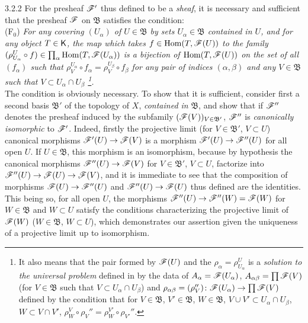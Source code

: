 \documentclass{book}
\begin{document}
\begin{env}{3.2.2}
\label{env-0.3.2.2}
For the presheaf $\mathscr{F}'$ thus defined to be a \emph{sheaf}, it is necessary and sufficient
that the presheaf $\mathscr{F}$ on $\mathfrak{B}$ satisfies the condition:\\

  (F$_0$) \emph{For any covering $(U_\alpha)$ of $U\in\mathfrak{B}$ by sets $U_\alpha\in\mathfrak{B}$
  contained in $U$, and for any object $T\in\mathsf{K}$, the map which takes $f\in{\mathop{\mathrm{Hom}}\nolimits}(T,\mathscr{F}(U))$
  to the family $(\rho_{U_\alpha}^U\circ f)\in\prod_\alpha{\mathop{\mathrm{Hom}}\nolimits}(T,\mathscr{F}(U_\alpha))$ is a bijection of
  ${\mathop{\mathrm{Hom}}\nolimits}(T,\mathscr{F}(U))$ on the set of all $(f_\alpha)$ such that $\rho_V^{U_\alpha}\circ f_\alpha=\rho_V^{U_\beta}\circ f_\beta$
  for any pair of indices $(\alpha,\beta)$ and any $V\in\mathfrak{B}$ such that $V\subset U_\alpha\cap U_\beta$
  \footnote{It also means that the pair formed by $\mathscr{F}(U)$ and the $\rho_\alpha=\rho_{U_\alpha}^U$
  is a \emph{solution to the universal problem} defined in  by the data of $A_\alpha=\mathscr{F}(U_\alpha)$,
  $A_{\alpha\beta}=\prod\mathscr{F}(V)$ (for $V\in\mathfrak{B}$ such that $V\subset U_\alpha\cap U_\beta$) and
  $\rho_{\alpha\beta}=(\rho_V'')\colon\mathscr{F}(U_\alpha)\to\prod\mathscr{F}(V)$ defined by the condition that for
  $V\in\mathfrak{B}$, $V'\in\mathfrak{B}$, $W\in\mathfrak{B}$, $V\cup V'\subset U_\alpha\cap U_\beta$,
  $W\subset V\cap V'$, $\rho_W^V\circ\rho_V''=\rho_W^{V'}\circ\rho_{V'}''$.}.}\\

The condition is obviously necessary. To show that it is sufficient,
consider first a second basis $\mathfrak{B}'$ of the topology of $X$, \emph{contained in} $\mathfrak{B}$, and
show that if $\mathscr{F}''$ denotes the presheaf induced by the subfamily $(\mathscr{F}(V))_{V\in\mathfrak{B}'}$, $\mathscr{F}''$ is
\emph{canonically isomorphic} to $\mathscr{F}'$. Indeed, firstly the projective limit (for $V\in\mathfrak{B}'$,
$V\subset U$) canonical morphisms ${\mathscr{F}'(U)\to\mathscr{F}(V)}$ is a morphism ${\mathscr{F}'(U)\to\mathscr{F}''(U)}$
for all open $U$. If $U\in\mathfrak{B}$, this morphism is an isomorphism, because by hypothesis
the canonical morphisms ${\mathscr{F}''(U)\to\mathscr{F}(V)}$ for $V\in\mathfrak{B}'$, $V\subset U$, factorize into
${\mathscr{F}''(U)\to\mathscr{F}(U)\to\mathscr{F}(V)}$, and it is immediate to see that the composition of morphisms
${\mathscr{F}(U)\to\mathscr{F}''(U)}$ and ${\mathscr{F}''(U)\to\mathscr{F}(U)}$ thus defined are the identities. This being so, for
all open $U$, the morphisms ${\mathscr{F}''(U)\to\mathscr{F}''(W)=\mathscr{F}(W)}$ for $W\in\mathfrak{B}$ and $W\subset U$ satisfy
the conditions characterizing the projective limit of $\mathscr{F}(W)$ ($W\in\mathfrak{B}$, $W\subset U$), which demonstrates
our assertion given the uniqueness of a projective limit up to isomorphism.


\end{env}
\end{document}
